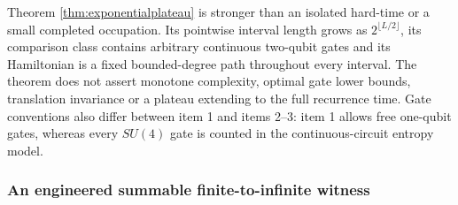 Theorem \ref{thm:exponentialplateau} is stronger than an isolated hard-time
or a small completed occupation.  Its pointwise interval length grows as
$2^{\lfloor L/2\rfloor}$, its comparison class contains arbitrary continuous
two-qubit gates and its Hamiltonian is a fixed bounded-degree path throughout
every interval.  The theorem does not assert monotone complexity, optimal
gate lower bounds, translation invariance or a plateau extending to the full
recurrence time.  Gate conventions also differ between item 1 and items
2--3: item 1 allows free one-qubit gates, whereas every $SU(4)$ gate is counted
in the continuous-circuit entropy model.

\subsubsection{An engineered summable finite-to-infinite witness}

